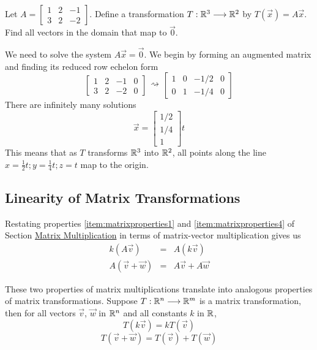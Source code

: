\documentclass{ximera}
\begin{document}
\begin{example}\label{ex:matrixTrans1}
    Let $A=\begin{bmatrix}1&2&-1\\3&2&-2\end{bmatrix}$.  Define a transformation 
    $T:\mathbb{R}^3\longrightarrow\mathbb{R}^2$ by 
    $T(\vec{x})=A\vec{x}$.  Find all vectors in the domain that map to $\vec{0}$.
 \begin{explanation}
    We need to solve the system $A\vec{x}=\vec{0}$.  We begin by forming an augmented matrix and finding its reduced row echelon form
    $$\left[\begin{array}{ccc|c} 
 1&2&-1&0\\3&2&-2&0
 \end{array}\right]\begin{array}{c}
 \\
 \rightsquigarrow\\
 \\
 \end{array}\left[\begin{array}{ccc|c} 
 1&0&-1/2&0\\0&1&-1/4&0
 \end{array}\right]$$
 There are infinitely many solutions
 $$\vec{x}=\begin{bmatrix}1/2\\1/4\\1\end{bmatrix}t$$
 This means that as $T$ transforms $\mathbb{R}^3$ into $\mathbb{R}^2$, all points along the line $x=\frac{1}{2}t; y=\frac{1}{4}t; z=t$ map to the origin.
\end{explanation}    
\end{example}

\subsection*{Linearity of Matrix Transformations}
Restating properties \ref{item:matrixproperties1} and \ref{item:matrixproperties4} of Section \href{https://ximera.osu.edu/oerlinalg/LinearAlgebra/MAT-0020/main}{Matrix Multiplication} in terms of matrix-vector multiplication gives us
\begin{eqnarray}\label{eq:linearityConstant}
 k(A\vec{v})&=&A(k\vec{v})\\
    A(\vec{v}+\vec{w})&=&A\vec{v}+A\vec{w}\label{eq:linearityAdd}
   \end{eqnarray}

These two properties of matrix multiplications translate into analogous properties of matrix transformations.  Suppose $T:\mathbb{R}^n\longrightarrow\mathbb{R}^m$ is a matrix transformation, then for all vectors $\vec{v}$, $\vec{w}$ in $\mathbb{R}^n$ and all constants $k$ in $\mathbb{R}$,
\begin{equation}\label{eq:matrixTransProp1} 
T(k\vec{v})=kT(\vec{v})
    \end{equation}
    \begin{equation}\label{eq:matrixTransProp2} T(\vec{v}+\vec{w})=T(\vec{v})+T(\vec{w})
    \end{equation}
\end{document}
